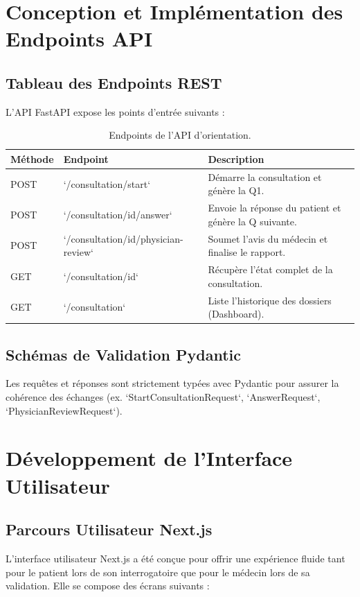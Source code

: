 \documentclass[11pt,a4paper]{report}
\begin{document}
\chapter{Conception et Implémentation des Endpoints API}
\section{Tableau des Endpoints REST}
L'API FastAPI expose les points d'entrée suivants :
\begin{table}[H]
\centering
\begin{tabular}{lll}
\toprule
\textbf{Méthode} & \textbf{Endpoint} & \textbf{Description} \\
\midrule
POST & `/consultation/start` & Démarre la consultation et génère la Q1. \\
POST & `/consultation/{id}/answer` & Envoie la réponse du patient et génère la Q suivante. \\
POST & `/consultation/{id}/physician-review` & Soumet l'avis du médecin et finalise le rapport. \\
GET & `/consultation/{id}` & Récupère l'état complet de la consultation. \\
GET & `/consultation` & Liste l'historique des dossiers (Dashboard). \\
\bottomrule
\end{tabular}
\caption{Endpoints de l'API d'orientation.}
\end{table}

\section{Schémas de Validation Pydantic}
Les requêtes et réponses sont strictement typées avec Pydantic pour assurer la cohérence des échanges (ex. `StartConsultationRequest`, `AnswerRequest`, `PhysicianReviewRequest`).

\chapter{Développement de l'Interface Utilisateur}
\section{Parcours Utilisateur Next.js}
L'interface utilisateur Next.js a été conçue pour offrir une expérience fluide tant pour le patient lors de son interrogatoire que pour le médecin lors de sa validation. Elle se compose des écrans suivants :
\end{document}
